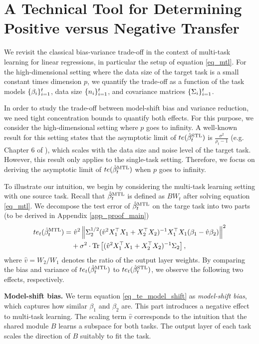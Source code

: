 \section{A Technical Tool for Determining Positive versus Negative Transfer}
\label{sec_main}

We revisit the classical bias-variance trade-off in the context of multi-task learning for linear regressions, in particular the setup of equation \eqref{eq_mtl}.
For the high-dimensional setting where the data size of the target task is a small constant times dimension $p$, we quantify the trade-off as a function of the task models $\{\beta_i\}_{i=1}^t$, data size $\{n_i\}_{i=1}^t$, and covariance matrices $\{\Sigma_i\}_{i=1}^t$.

In order to study the trade-off between model-shift bias and variance reduction, we need tight concentration bounds to quantify both effects.
For this purpose, we consider the high-dimensional setting where $p$ goes to infinity.
A well-known result for this setting states that the asymptotic limit of $te(\hat{\beta}_t^{\text{STL}})$ is $\frac {\sigma^2} {\rho_t - 1}$ (e.g. Chapter 6 of \cite{S07}), which scales with the data size and noise level of the target task.
However, this result only applies to the single-task setting.
Therefore, we focus on deriving the asymptotic limit of $te(\hat{\beta}_t^{\text{MTL}})$ when $p$ goes to infinity.

To illustrate our intuition, we begin by considering the multi-task learning setting with one source task.
Recall that $\hat{\beta}_t^{\text{MTL}}$ is defined as $BW_t$ after solving equation \eqref{eq_mtl}.
We decompose the test error of $\hat{\beta}_{t}^{\text{MTL}}$ on the targe task into two parts (to be derived in Appendix \ref{app_proof_main})
\begin{align}
	te_t(\hat{\beta}_t^{\text{MTL}}) =& ~ \hat{v}^2 \left\| \Sigma_2^{1/2} (\hat{v}^2 X_1^{\top}X_1 + X_2^{\top}X_2)^{-1}X_1^{\top}X_1 (\beta_1 - \hat{v}\beta_2) \right\|^2 \label{eq_te_model_shift} \\
	&+ \sigma^2\cdot \operatorname{Tr}\left[(\hat{v}^2 X_1^{\top}X_1 + X_2^{\top}X_2)^{-1}\Sigma_2\right], \label{eq_te_var}
\end{align}
where $\hat{v} = W_2 / W_1$ denotes the ratio of the output layer weights.
By comparing the bias and variance of $te_t(\hat{\beta}_t^{\text{MTL}})$ to $te_t(\hat{\beta}_t^{\text{STL}})$, we observe the following two effects, respectively.


\textbf{Model-shift bias.}
We term equation \eqref{eq_te_model_shift} as \textit{model-shift bias}, which captures how similar $\beta_1$ and $\beta_2$ are.
This part introduces a negative effect to multi-task learning.
The scaling term $\hat{v}$ corresponds to the intuition that the shared module $B$ learns a subspace for both tasks.
The output layer of each task scales the direction of $B$ suitably to fit the task.

